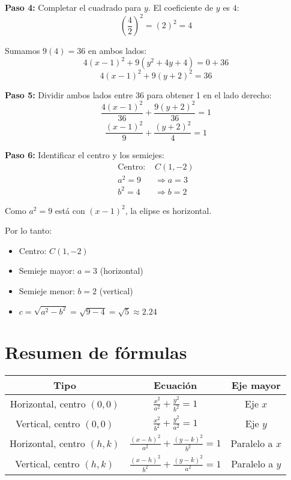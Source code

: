 \documentclass[12pt,a4paper]{article}
\begin{document}
	\textbf{Paso 4:} Completar el cuadrado para $y$. El coeficiente de $y$ es $4$:
	\[
	\left(\frac{4}{2}\right)^2=(2)^2=4
	\]

	Sumamos $9(4)=36$ en ambos lados:
	\[
	4(x-1)^2+9(y^2+4y+4)=0+36
	\]
	\[
	4(x-1)^2+9(y+2)^2=36
	\]

	\textbf{Paso 5:} Dividir ambos lados entre 36 para obtener 1 en el lado derecho:
	\[
	\frac{4(x-1)^2}{36}+\frac{9(y+2)^2}{36}=1
	\]
	\[
	\frac{(x-1)^2}{9}+\frac{(y+2)^2}{4}=1
	\]

	\textbf{Paso 6:} Identificar el centro y los semiejes:
	\[
	\begin{aligned}
		\text{Centro: }&C(1,-2)\\
		a^2=9&\Rightarrow a=3\\
		b^2=4&\Rightarrow b=2
	\end{aligned}
	\]

	Como $a^2=9$ está con $(x-1)^2$, la elipse es horizontal.

	Por lo tanto:
	\begin{itemize}
		\item Centro: $\boxed{C(1,-2)}$
		\item Semieje mayor: $\boxed{a=3}$ (horizontal)
		\item Semieje menor: $\boxed{b=2}$ (vertical)
		\item $c=\sqrt{a^2-b^2}=\sqrt{9-4}=\sqrt{5}\approx 2.24$
	\end{itemize}

	\section{Resumen de fórmulas}

	\begin{center}
		\begin{tabular}{|c|c|c|}
			\hline
			\textbf{Tipo} & \textbf{Ecuación} & \textbf{Eje mayor}\\
			\hline
			Horizontal, centro $(0,0)$ & $\displaystyle\frac{x^2}{a^2}+\frac{y^2}{b^2}=1$ & Eje $x$\\
			\hline
			Vertical, centro $(0,0)$ & $\displaystyle\frac{x^2}{b^2}+\frac{y^2}{a^2}=1$ & Eje $y$\\
			\hline
			Horizontal, centro $(h,k)$ & $\displaystyle\frac{(x-h)^2}{a^2}+\frac{(y-k)^2}{b^2}=1$ & Paralelo a $x$\\
			\hline
			Vertical, centro $(h,k)$ & $\displaystyle\frac{(x-h)^2}{b^2}+\frac{(y-k)^2}{a^2}=1$ & Paralelo a $y$\\
			\hline
		\end{tabular}
	\end{center}
\end{document}
